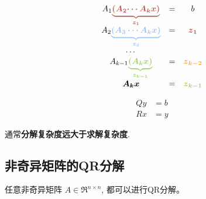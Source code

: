 \begin{example}[求解$k$个线性方程组 $ A_{1} A_{2} \cdots A_{k} x=b $]
    \begin{equation}\displaystyle \begin{matrix}
        A_{1}\textcolor[rgb]{0.72,0.33,0.31}{\boldsymbol{\underbrace{\boldsymbol{\textcolor[rgb]{0.72,0.33,0.31}{(}\textcolor[rgb]{0.72,0.33,0.31}{A}\textcolor[rgb]{0.72,0.33,0.31}{_{2}}\textcolor[rgb]{0.72,0.33,0.31}{\cdots A}\textcolor[rgb]{0.72,0.33,0.31}{_{k}}\textcolor[rgb]{0.72,0.33,0.31}{x}\textcolor[rgb]{0.72,0.33,0.31}{)}}}_{z_{1}}}} & = & b\\
        \textcolor[rgb]{0,0,0}{A}\textcolor[rgb]{0,0,0}{_{2}}\textcolor[rgb]{0.6,0.76,0.96}{\underbrace{\boldsymbol{( A_{3} \cdots A_{k} x)}}_{\boldsymbol{z_{2}}}} & = & \boldsymbol{\textcolor[rgb]{0.72,0.33,0.31}{z}\textcolor[rgb]{0.72,0.33,0.31}{_{1}}}\\
        \cdots  &  & \\
        A_{k-1}\textcolor[rgb]{0.63,0.81,0.37}{\boldsymbol{\underbrace{(\textcolor[rgb]{0.63,0.81,0.37}{A}\textcolor[rgb]{0.63,0.81,0.37}{_{k}}\textcolor[rgb]{0.63,0.81,0.37}{x}\textcolor[rgb]{0.63,0.81,0.37}{)}}_{z_{k-1}}}} & = & \boldsymbol{\textcolor[rgb]{0.96,0.65,0.14}{z}\textcolor[rgb]{0.96,0.65,0.14}{_{k-2}}}\\
        \boldsymbol{A_{k} x} & = & \boldsymbol{\textcolor[rgb]{0.63,0.81,0.37}{z}\textcolor[rgb]{0.63,0.81,0.37}{_{k-1}}}
        \end{matrix}\end{equation}
\end{example}

\begin{example}[QR分解$Ax = b$]
    \begin{equation}
\begin{aligned}
    Q y&=b\\
    R x&=y
\end{aligned}
\end{equation}
\end{example}

通常\textbf{分解复杂度远大于求解复杂度}.

\subsection{非奇异矩阵的QR分解}

\begin{theorem}
    任意非奇异矩阵 $ A \in \mathfrak{R}^{n \times n} $, 都可以进行QR分解。
\end{theorem}

